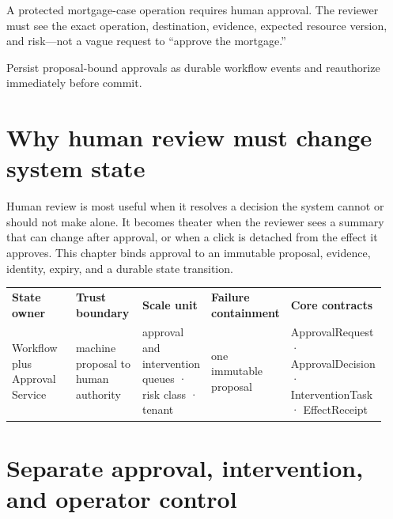 \begin{bookcallout}
A protected mortgage-case operation requires human approval. The reviewer must see the exact operation, destination, evidence, expected resource version, and risk—not a vague request to “approve the mortgage.”
\end{bookcallout}

\begin{bookcallout}
Persist proposal-bound approvals as durable workflow events and reauthorize immediately before commit.
\end{bookcallout}

\section{Why human review must change system state}

Human review is most useful when it resolves a decision the system cannot or should not make alone. It becomes theater when the reviewer sees a summary that can change after approval, or when a click is detached from the effect it approves. This chapter binds approval to an immutable proposal, evidence, identity, expiry, and a durable state transition.\par

\BookTableStart
\fontsize{7.2}{9}\selectfont
\begin{tabular}{@{}Y{0.1880\linewidth}Y{0.1880\linewidth}Y{0.1880\linewidth}Y{0.1880\linewidth}Y{0.1880\linewidth}@{}}
\color{white}\bfseries \textbf{State owner} & \color{white}\bfseries \textbf{Trust boundary} & \color{white}\bfseries \textbf{Scale unit} & \color{white}\bfseries \textbf{Failure containment} & \color{white}\bfseries \textbf{Core contracts} \\
Workflow plus Approval Service & machine proposal to human authority & approval and intervention queues · risk class · tenant & one immutable proposal & ApprovalRequest · ApprovalDecision · InterventionTask · EffectReceipt \\
\end{tabular}
\BookTableEnd

\section{Separate approval, intervention, and operator control}


